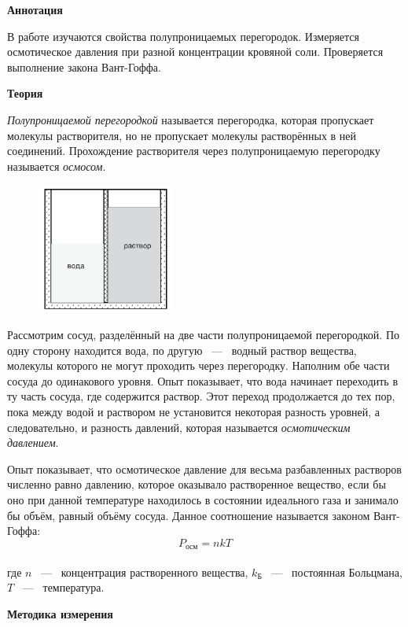 \textbf{\Large Аннотация}

В работе изучаются свойства полупроницаемых перегородок. Измеряется осмотическое давления при разной концентрации кровяной соли. Проверяется выполнение закона Вант-Гоффа.

\textbf{\Large Теория}

\textit{Полупроницаемой перегородкой} называется перегородка, которая пропускает молекулы растворителя, но не пропускает молекулы растворённых в ней соединений. Прохождение растворителя через полупроницаемую перегородку называется \textit{осмосом}.

\begin{figure}
	\centering
	\includegraphics[width=0.4\textwidth]{../images/scheme_theory.png}
\end{figure}

Рассмотрим сосуд, разделённый на две части полупроницаемой перегородкой. По одну сторону находится вода, по другую ~---~ водный раствор вещества, молекулы которого не могут проходить через перегородку. Наполним обе части сосуда до одинакового уровня. Опыт показывает, что вода начинает переходить в ту часть сосуда, где содержится раствор. Этот переход продолжается до тех пор, пока между водой и раствором не установится некоторая разность уровней, а следовательно, и разность давлений, которая называется \textit{осмотическим давлением}.

Опыт показывает, что осмотическое давление для весьма разбавленных растворов численно равно давлению, которое оказывало растворенное вещество, если бы оно при данной температуре находилось в состоянии идеального газа и занимало бы объём, равный объёму сосуда. Данное соотношение называется законом Вант-Гоффа:
$$
P_{осм} = n k T
$$ \\
где $n$ ~---~ концентрация растворенного вещества, $k_Б$ ~---~ постоянная Больцмана, $T$ ~---~ температура.

\newpage

\textbf{\Large Методика измерения}

